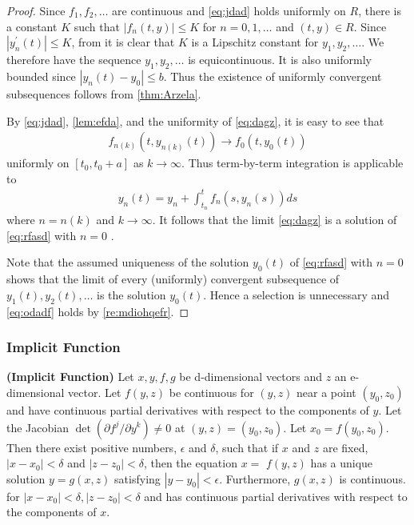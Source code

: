 \documentclass{article}
\newcommand{\bfs}[1]{\textbf{({#1}) }}
\begin{document}
\begin{proof}
 Since $f_{1}, f_{2}, \ldots$ are continuous and \cref{eq:jdad} holds uniformly on $R$, there is a constant $K$ such that $\left|f_{n}(t, y)\right| \le K$ for $n=0,1, \ldots$ and $(t, y) \in R$. Since $\left|y_{n}^{\prime}(t)\right| \le K$, from \cite[Theorem 5.19]{rudin1976principles} it is clear that $K$ is a Lipschitz constant for  $y_{1}, y_{2}, \ldots$. We therefore have the sequence $y_{1}, y_{2}, \ldots$ is equicontinuous. It is also uniformly bounded since $\left|y_{n}(t)-y_{0}\right| \le b$. Thus the existence of uniformly convergent subsequences follows from \cref{thm:Arzela}. 

 By \cref{eq:jdad}, \cref{lem:efda}, and the uniformity of \cref{eq:dagz}, it is easy to see that
\begin{align*}
f_{n(k)}\left(t, y_{n(k)}(t)\right) \rightarrow f_{0}\left(t, y_{0}(t)\right)
\end{align*}
uniformly on $\left[t_{0}, t_{0}+a\right]$ as $k \rightarrow \infty$. Thus term-by-term integration is applicable to
\begin{align*}
y_{n}(t)=y_{n}+\int_{t_{n}}^{t} f_{n}\left(s, y_{n}(s)\right) d s
\end{align*}
where $n=n(k)$ and $k \rightarrow \infty$. It follows that the limit \cref{eq:dagz} is a solution of \cref{eq:rfasd} with $n=0$ .

 Note that the assumed uniqueness of the solution $y_{0}(t)$ of \cref{eq:rfasd} with $n=0$  shows that the limit of every (uniformly) convergent subsequence of $y_{1}(t), y_{2}(t), \ldots$ is the solution $y_{0}(t)$. Hence a selection is unnecessary and \cref{eq:odadf} holds by \cref{re:mdiohqefr}.
\end{proof} 

\subsubsection{Implicit Function }
\begin{thma}\bfs{Implicit Function}
Let $x, y, f, g$ be d-dimensional vectors and $z$ an e-dimensional vector. Let $f(y, z)$ be continuous for $(y, z)$ near a point $\left(y_{0}, z_{0}\right)$ and have continuous partial derivatives with respect to the components of $y .$ Let the Jacobian $\operatorname{det}\left(\partial f^{j} / \partial y^{k}\right) \neq 0$ at $(y, z)=\left(y_{0}, z_{0}\right)$. Let $x_{0}=f\left(y_{0}, z_{0}\right)$. Then there exist positive numbers, $\epsilon$ and $\delta$, such that if $x$ and $z$ are fixed, $\left|x-x_{0}\right|<\delta$ and $\left|z-z_{0}\right|<\delta$, then the equation $x=$ $f(y, z)$ has a unique solution $y=g(x, z)$ satisfying $\left|y-y_{0}\right|<\epsilon$. Furthermore, $g(x, z)$ is continuous. for $\left|x-x_{0}\right|<\delta,\left|z-z_{0}\right|<\delta$ and has continuous partial derivatives with respect to the components of $x$.
\end{thma}
 
\end{document}
